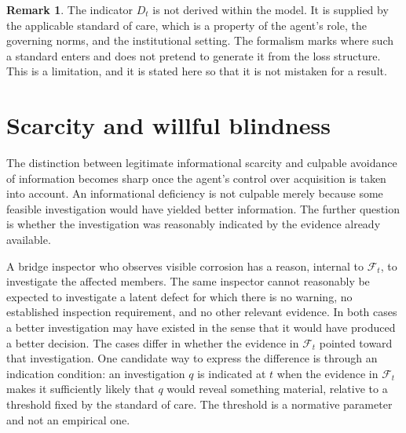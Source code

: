 \documentclass[11pt]{article}
\newcommand{\F}{\mathcal F}
\theoremstyle{definition}
\newtheorem{remark}{Remark}
\begin{document}
\begin{remark}
The indicator $D_t$ is not derived within the model. It is supplied by the applicable standard of care, which is a property of the agent's role, the governing norms, and the institutional setting. The formalism marks where such a standard enters and does not pretend to generate it from the loss structure. This is a limitation, and it is stated here so that it is not mistaken for a result.
\end{remark}

\section{Scarcity and willful blindness}

The distinction between legitimate informational scarcity and culpable avoidance of information becomes sharp once the agent's control over acquisition is taken into account. An informational deficiency is not culpable merely because some feasible investigation would have yielded better information. The further question is whether the investigation was reasonably indicated by the evidence already available.

A bridge inspector who observes visible corrosion has a reason, internal to $\F_t$, to investigate the affected members. The same inspector cannot reasonably be expected to investigate a latent defect for which there is no warning, no established inspection requirement, and no other relevant evidence. In both cases a better investigation may have existed in the sense that it would have produced a better decision. The cases differ in whether the evidence in $\F_t$ pointed toward that investigation. One candidate way to express the difference is through an indication condition: an investigation $q$ is indicated at $t$ when the evidence in $\F_t$ makes it sufficiently likely that $q$ would reveal something material, relative to a threshold fixed by the standard of care. The threshold is a normative parameter and not an empirical one.
\end{document}
